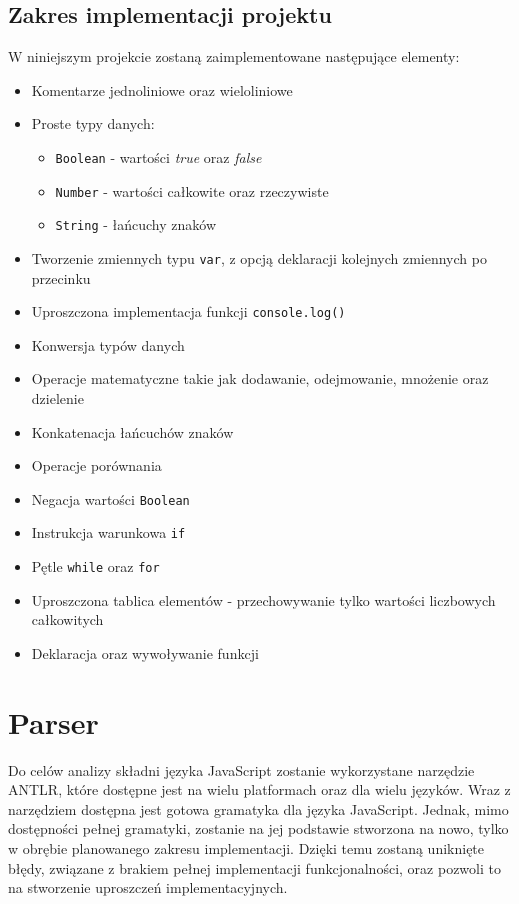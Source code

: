 \subsection{Zakres implementacji projektu}
W niniejszym projekcie zostaną zaimplementowane następujące elementy: 
\begin{itemize}
  \item Komentarze jednoliniowe oraz wieloliniowe
  \item Proste typy danych: 
  \begin{itemize}
    \item \texttt{Boolean} - wartości \textit{true} oraz \textit{false}
    \item \texttt{Number} - wartości całkowite oraz rzeczywiste
    \item \texttt{String} - łańcuchy znaków
  \end{itemize}
  \item Tworzenie zmiennych typu \texttt{var}, z opcją deklaracji kolejnych zmiennych po przecinku
  \item Uproszczona implementacja funkcji \texttt{console.log()}
  \item Konwersja typów danych
  \item Operacje matematyczne takie jak dodawanie, odejmowanie, mnożenie oraz dzielenie
  \item Konkatenacja łańcuchów znaków
  \item Operacje porównania
  \item Negacja wartości \texttt{Boolean}
  \item Instrukcja warunkowa \texttt{if}
  \item Pętle \texttt{while} oraz \texttt{for}
  \item Uproszczona tablica elementów - przechowywanie tylko wartości liczbowych całkowitych
  \item Deklaracja oraz wywoływanie funkcji
\end{itemize}


\section{Parser}
\par Do celów analizy składni języka JavaScript zostanie wykorzystane narzędzie ANTLR, które dostępne jest na wielu platformach oraz dla wielu języków. Wraz z narzędziem dostępna jest gotowa gramatyka dla języka JavaScript. Jednak, mimo dostępności pełnej gramatyki, zostanie na jej podstawie stworzona na nowo, tylko w obrębie planowanego zakresu implementacji. Dzięki temu zostaną uniknięte błędy, związane z brakiem pełnej implementacji funkcjonalności, oraz pozwoli to na stworzenie uproszczeń implementacyjnych.

